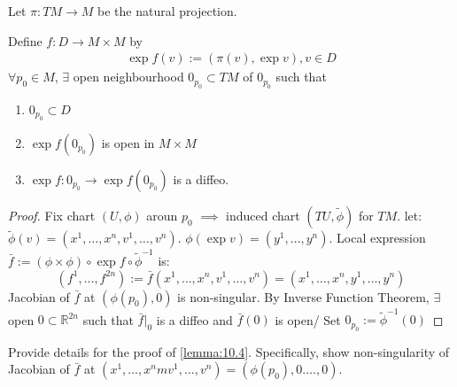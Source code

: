 Let $\pi : TM \to M$ be the natural projection.

\begin{lemma}\label{lemma:10.4}
    Define $f: D \to M \times M$ by
    \[
    \begin{aligned}
        \exp f(v) := \left( \pi(v), \exp v\right), v \in D
    \end{aligned}
    \]
    $\forall p_0 \in M$, $\exists$ open neighbourhood $0_{p_0} \subset TM$ of $0_{p_0}$ such that
    \begin{enumerate}
        \item $0_{p_0} \subset D$
        \item $\exp f(0_{p_0})$ is open in $M \times M$
        \item $\exp f : 0_{p_0} \to \exp f(0_{p_0})$ is a diffeo.
    \end{enumerate}
\end{lemma}

\begin{proof}
    Fix chart $(U, \phi)$ aroun $p_0$ $\implies$ induced chart $(TU,\tilde{\phi})$ for $TM$. let:
    $\tilde{\phi}(v) = (x^1, \dots, x^n, v^1, \dots, v^n)$.
    $\phi(\exp v) = (y^1, \dots, y^n)$.
    Local expression $\bar{f} := (\phi \times \phi) \circ \exp f \circ \tilde{\phi}^{-1}$ is:
    \[
    (f^1, \dots, f^{2n}) := \bar{f}(x^1, \dots, x^n, v^1, \dots, v^n) = (x^1, \dots, x^n, y^1, \dots, y^n)
    \]
    Jacobian of $\bar{f}$ at $(\phi(p_0),0)$ is non-singular.
    By Inverse Function Theorem, $\exists$ open $0 \subset \mathbb{R}^{2n}$ such that
    $\bar{f}|_0$ is a diffeo and $\bar{f}(0)$ is open/
    Set $0_{p_0} := \tilde{\phi}^{-1}(0)$
\end{proof}

\begin{problem}
    Provide details for the proof of \autoref{lemma:10.4}.
    Specifically, show non-singularity of Jacobian of $\bar{f}$ at 
    $(x^1, \dots, x^nm v^1, \dots, v^n) = (\phi(p_0),0. \dots,0)$. 
    \label{problem:10.5}
\end{problem}

